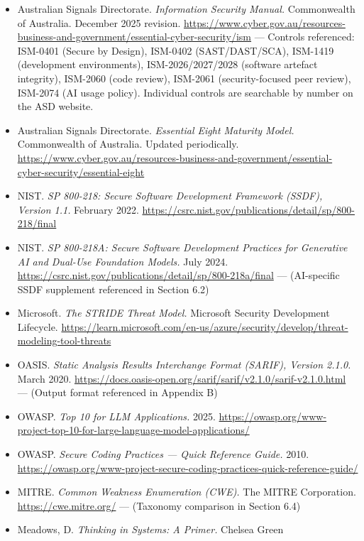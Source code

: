 \documentclass[a4paper,11pt]{report}
\providecommand{\tightlist}{%
  \setlength{\itemsep}{0pt}\setlength{\parskip}{0pt}}
\begin{document}
\begin{itemize}
\tightlist
\item
  Australian Signals Directorate. \emph{Information Security Manual.}
  Commonwealth of Australia. December 2025 revision.
  \url{https://www.cyber.gov.au/resources-business-and-government/essential-cyber-security/ism}
  --- Controls referenced: ISM-0401 (Secure by Design), ISM-0402
  (SAST/DAST/SCA), ISM-1419 (development environments),
  ISM-2026/2027/2028 (software artefact integrity), ISM-2060 (code
  review), ISM-2061 (security-focused peer review), ISM-2074 (AI usage
  policy). Individual controls are searchable by number on the ASD
  website.
\item
  Australian Signals Directorate. \emph{Essential Eight Maturity Model.}
  Commonwealth of Australia. Updated periodically.
  \url{https://www.cyber.gov.au/resources-business-and-government/essential-cyber-security/essential-eight}
\item
  NIST. \emph{SP 800-218: Secure Software Development Framework (SSDF),
  Version 1.1.} February 2022.
  \url{https://csrc.nist.gov/publications/detail/sp/800-218/final}
\item
  NIST. \emph{SP 800-218A: Secure Software Development Practices for
  Generative AI and Dual-Use Foundation Models.} July 2024.
  \url{https://csrc.nist.gov/publications/detail/sp/800-218a/final} ---
  (AI-specific SSDF supplement referenced in Section 6.2)
\item
  Microsoft. \emph{The STRIDE Threat Model.} Microsoft Security
  Development Lifecycle.
  \url{https://learn.microsoft.com/en-us/azure/security/develop/threat-modeling-tool-threats}
\item
  OASIS. \emph{Static Analysis Results Interchange Format (SARIF),
  Version 2.1.0.} March 2020.
  \url{https://docs.oasis-open.org/sarif/sarif/v2.1.0/sarif-v2.1.0.html}
  --- (Output format referenced in Appendix B)
\item
  OWASP. \emph{Top 10 for LLM Applications.} 2025.
  \url{https://owasp.org/www-project-top-10-for-large-language-model-applications/}
\item
  OWASP. \emph{Secure Coding Practices --- Quick Reference Guide.} 2010.
  \url{https://owasp.org/www-project-secure-coding-practices-quick-reference-guide/}
\item
  MITRE. \emph{Common Weakness Enumeration (CWE).} The MITRE
  Corporation. \url{https://cwe.mitre.org/} --- (Taxonomy comparison in
  Section 6.4)
\item
  Meadows, D. \emph{Thinking in Systems: A Primer.} Chelsea Green

\end{itemize}
\end{document}
